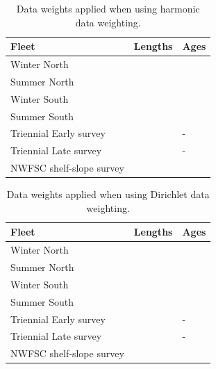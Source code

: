 \documentclass[12pt,]{article}
\begin{document}
\FloatBarrier 

\begin{table}[ht]
\centering
\caption{Data weights applied when using harmonic data weighting.} 
\label{tab:harm}
\begin{tabular}{>{\raggedright}p{2in}>{\centering}p{.7in}>{\centering}p{.7in}}
  \hline
Fleet & Lengths & Ages \\ 
  \hline
Winter North &  &  \\ 
  Summer North &  &  \\ 
  Winter South &  &  \\ 
  Summer South &  &  \\ 
  Triennial Early survey &  & - \\ 
  Triennial Late survey &  & - \\ 
  NWFSC shelf-slope survey &  &  \\ 
   \hline
\end{tabular}
\end{table}

\FloatBarrier 

\begin{table}[ht]
\centering
\caption{Data weights applied when using Dirichlet data weighting.} 
\label{tab:dirichlet}
\begin{tabular}{>{\raggedright}p{2in}>{\centering}p{.7in}>{\centering}p{.7in}}
  \hline
Fleet & Lengths & Ages \\ 
  \hline
Winter North &  &  \\ 
  Summer North &  &  \\ 
  Winter South &  &  \\ 
  Summer South &  &  \\ 
  Triennial Early survey &  & - \\ 
  Triennial Late survey &  & - \\ 
  NWFSC shelf-slope survey &  &  \\ 
   \hline
\end{tabular}
\end{table}

\FloatBarrier 

\newpage
\end{document}
